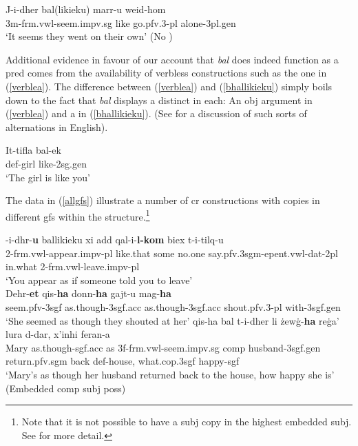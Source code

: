 \documentclass[output=paper]{LSP/langsci}
\begin{document}
\ea \label{itbhal}
\gll J-i-dher b\textcrh al(likieku) marr-u we\textcrh id-hom\\
3{\sc m}-{\sc frm.vwl}-seem.{\sc impv.sg} like go.{\sc pfv.3-pl} alone-{\sc 3pl.gen}\\
\glt `It seems they went on their own' \hfill{(No )}
\z 

Additional evidence in favour of our account that \emph{b\textcrh al} does indeed function as a {\sc pred} comes from the availability of verbless constructions such as the one in (\ref{verblea}). The difference between (\ref{verblea}) and (\ref{bhallikieku}) simply boils down to the fact that \emph{b\textcrh al} displays a distinct  in each: An {\sc obj} argument in (\ref{verblea}) and a  in (\ref{bhallikieku}). (See  for a discussion of such sorts of alternations in English).

\ea \label{verblea}
\gll It-tifla b\textcrh al-ek\\
{\sc def-}girl like-{\sc 2sg.gen}\\
\glt `The girl is like you'
\z

The data in (\ref{allgfs}) illustrate a number of {\sc cr} constructions with copies in different {\sc gf}s within the structure.\footnote{Note that it is not possible to have a {\sc subj} copy in the highest embedded {\sc subj}. See  for more detail.}

\ea \label{allgfs}
\ea \label{tidhrubhallikieku}
-i-dhr-{\bf{u}} b\textcrh allikieku xi \textcrh add qal-i-{\bf{l-kom}} biex t-i-tilq-u\\ 
2-{\sc frm.vwl}-appear.{\sc impv-pl} like.that some no.one say.{\sc pfv.3sgm-epent.vwl-dat-2pl} in.what 2-{\sc frm.vwl}-leave.{\sc impv-pl}\\
\glt `You appear as if someone told you to leave' \\\citep[Embedded {\sc comp obj};{\textsubscript{\texttheta}}][192]{CES:LFG14}
\ex \label{cooccurboth}
\gll Dehr-{\bf{et}} qis-{\bf{ha}} donn-{\bf{ha}} g\textcrh ajt-u mag\textcrh-{\bf{ha}}\\
seem.{\sc pfv-3sgf} as.though-{\sc 3sgf.acc} as.though-{\sc 3sgf.acc} shout.{\sc pfv.3-pl} with-{\sc 3sgf.gen}\\
\glt `She seemed as though they shouted at her' 
\glt \hfill{\citep[Chained  + Embedded {\sc comp obl obj};][193]{CES:LFG14}}
\ex
{} qis-ha b\textcrh al t-i-dher li {\.z}ew{\.g}-{\bf{ha}} re{\.g}a' lura d-dar, x'inhi fer\textcrh an-a\\
Mary as.though-{\sc sgf.acc} as 3{\sc f}-{\sc frm.vwl}-seem.{\sc impv.sg} {\sc comp} husband-{\sc 3sgf.gen} return.{\sc pfv.sgm} back {\sc def-}house, what.{\sc cop.3sgf} happy-{\sc sgf}\\
\glt `Mary's as though her husband returned back to the house, how happy she is'  \\(Embedded {\sc comp subj poss})   
\z
\z
\end{document}
